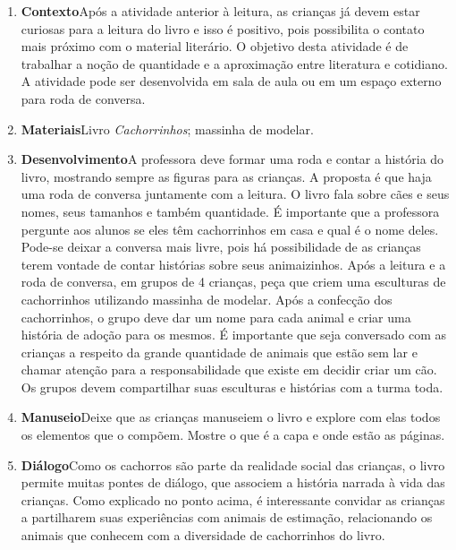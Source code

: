 \documentclass[11pt]{extarticle}
\begin{document}
\begin{enumerate}
\item \textbf{Contexto}\quad Após a atividade anterior à leitura, as crianças já devem estar curiosas para a leitura do livro e isso é positivo, pois possibilita o contato mais próximo com o material literário. O objetivo desta atividade é de trabalhar a noção de quantidade e a aproximação entre literatura e cotidiano. A atividade pode ser desenvolvida em sala de aula ou em um espaço externo para roda de conversa.

\item \textbf{Materiais}\quad Livro \textit{Cachorrinhos}; massinha de modelar.


\item \textbf{Desenvolvimento}\quad A professora deve formar uma roda e contar a história do livro, mostrando sempre as figuras para as crianças. A proposta é que haja uma roda de conversa juntamente com a leitura. O livro fala sobre cães e seus nomes, seus tamanhos e também quantidade. É importante que a professora pergunte aos alunos se eles têm cachorrinhos em casa e qual é o nome deles. Pode-se deixar a conversa mais livre, pois há possibilidade de as crianças terem vontade de contar histórias sobre seus animaizinhos. Após a leitura e a roda de conversa, em grupos de 4 crianças, peça que criem uma esculturas de cachorrinhos utilizando massinha de modelar. Após a confecção dos cachorrinhos, o grupo deve dar um nome para cada animal e criar uma história de adoção para os mesmos. É importante que seja conversado com as crianças a respeito da grande quantidade de animais que estão sem lar e chamar atenção para a responsabilidade que existe em decidir criar um cão. Os grupos devem compartilhar suas esculturas e histórias com a turma toda.
 
\item \textbf{Manuseio}\quad Deixe que as crianças manuseiem o livro 
e explore com elas todos os elementos que o compõem. Mostre o que é a 
capa e onde estão as páginas.

\item \textbf{Diálogo}\quad Como os cachorros são parte da realidade social das crianças, o livro permite muitas pontes de diálogo, que associem a história narrada à vida das crianças.
Como explicado no ponto acima, é interessante convidar as crianças a partilharem suas experiências com animais de estimação, relacionando os animais que conhecem com a diversidade de cachorrinhos do livro.


\end{enumerate}
\end{document}
